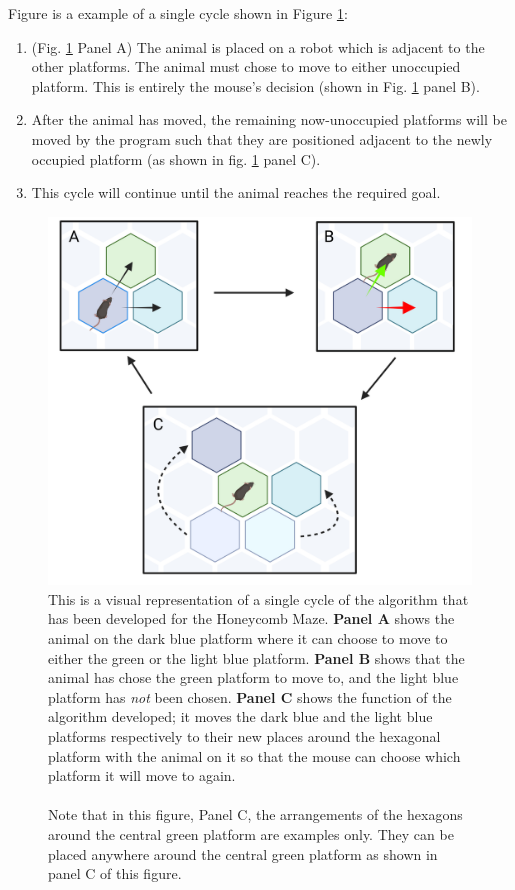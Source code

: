 Figure is a example of a single cycle shown in Figure \ref{fig:example_algorithm}:
\begin{enumerate}
    \item(Fig. \ref{fig:example_algorithm} Panel A) The animal is placed on a robot which is adjacent to the other platforms. The animal must chose to move to either unoccupied platform. This is entirely the mouse's decision (shown in Fig. \ref{fig:example_algorithm} panel B).
    \item After the animal has moved, the remaining now-unoccupied platforms will be moved by the program such that they are positioned adjacent to the newly occupied platform (as shown in fig. \ref{fig:example_algorithm} panel C).
    \item This cycle will continue until the animal reaches the required goal.
\end{enumerate}



\begin{figure}[H]
    \centering
    \includegraphics[scale=0.6]{images/example_algorithm.png}
    \caption{ This is a visual representation of a single cycle of the algorithm that has been developed for the Honeycomb Maze. \textbf{Panel A} shows the animal on the dark blue platform where it can choose to move to either the green or the light blue platform. \textbf{Panel B} shows that the animal has chose the green platform to move to, and the light blue platform has \textit{not} been chosen. \textbf{Panel C} shows the function of the algorithm developed; it moves the dark blue and the light blue platforms respectively to their new places around the hexagonal platform with the animal on it so that the mouse can choose which platform it will move to again. \\ \\
    Note that in this figure, Panel C, the arrangements of the hexagons around the central green platform are examples only. They can be placed anywhere around the central green platform as shown in panel C of this figure.}
    \label{fig:example_algorithm}
\end{figure}


